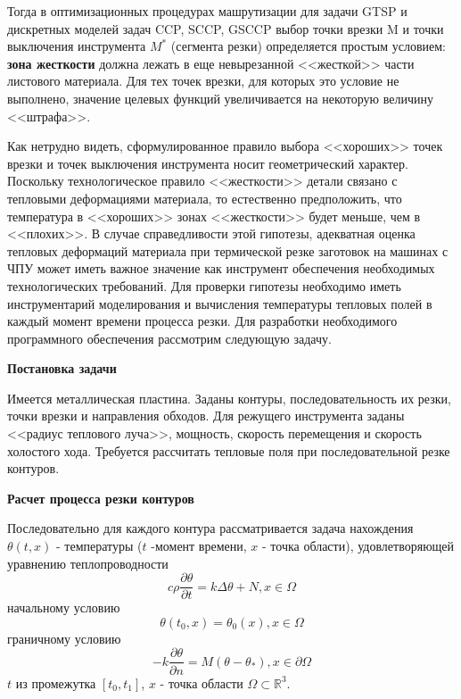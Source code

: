 \documentclass[11pt,twoside,openany]{report}
\begin{document}
Тогда в оптимизационных процедурах машрутизации
для задачи GTSP  и дискретных моделей задач CCP, SCCP, GSCCP
выбор точки врезки M и точки выключения инструмента $M^*$
(сегмента резки) определяется простым условием:
{\bf зона жесткости} должна лежать в еще невырезанной
<<жесткой>> части листового материала.
Для тех точек врезки, для которых это условие не выполнено,
значение целевых функций  увеличивается на некоторую величину <<штрафа>>.

Как нетрудно видеть,
сформулированное правило выбора <<хороших>> точек врезки
и точек выключения инструмента носит геометрический характер.
Поскольку технологическое правило <<жесткости>> детали
связано с тепловыми деформациями материала,
то естественно предположить,
что температура в <<хороших>> зонах <<жесткости>> будет меньше,
чем в <<плохих>>.
В случае справедливости этой гипотезы,
адекватная оценка тепловых деформаций материала
при термической резке заготовок на машинах с ЧПУ
может иметь важное значение как инструмент
обеспечения необходимых технологических требований.
Для проверки гипотезы необходимо иметь инструментарий
моделирования и вычисления температуры тепловых полей в
каждый момент времени процесса резки.
Для разработки необходимого программного
обеспечения рассмотрим следующую задачу.

{\bf Постановка задачи}

Имеется металлическая пластина.
Заданы контуры, последовательность их резки,
точки врезки и направления обходов.
Для режущего инструмента заданы <<радиус теплового луча>>,
мощность, скорость перемещения и скорость холостого хода.
Требуется рассчитать тепловые поля при
последовательной резке контуров.

{\bf Расчет процесса резки контуров}

Последовательно для каждого контура рассматривается задача нахождения
$\theta(t, x)$ - температуры
($t$ -момент времени,
$x$ - точка области), удовлетворяющей уравнению теплопроводности
\begin{equation}
c \rho \frac{\partial \theta}{\partial t}=k \Delta \theta +N, x \in \Omega
\end{equation}
начальному условию
\begin{equation}
  \theta(t_0, x)=\theta_0(x), x \in \Omega
\end{equation}
граничному условию
\begin{equation}
  -k \frac{\partial \theta}{\partial n}=M(\theta - \theta_*), x \in \partial \Omega
\end{equation}
$t$ из промежутка $[t_0, t_1]$,
$x$ - точка области
$\Omega \subset \mathbb R^3$.
\end{document}
